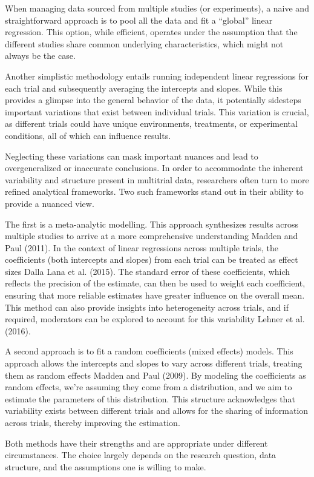 \documentclass[
  letterpaper,
]{book}
\begin{document}
When managing data sourced from multiple studies (or experiments), a
naive and straightforward approach is to pool all the data and fit a
``global'' linear regression. This option, while efficient, operates
under the assumption that the different studies share common underlying
characteristics, which might not always be the case.

Another simplistic methodology entails running independent linear
regressions for each trial and subsequently averaging the intercepts and
slopes. While this provides a glimpse into the general behavior of the
data, it potentially sidesteps important variations that exist between
individual trials. This variation is crucial, as different trials could
have unique environments, treatments, or experimental conditions, all of
which can influence results.

Neglecting these variations can mask important nuances and lead to
overgeneralized or inaccurate conclusions. In order to accommodate the
inherent variability and structure present in multitrial data,
researchers often turn to more refined analytical frameworks. Two such
frameworks stand out in their ability to provide a nuanced view.

The first is a meta-analytic modelling. This approach synthesizes
results across multiple studies to arrive at a more comprehensive
understanding Madden and Paul (2011). In the context of linear
regressions across multiple trials, the coefficients (both intercepts
and slopes) from each trial can be treated as effect sizes Dalla Lana et
al. (2015). The standard error of these coefficients, which reflects the
precision of the estimate, can then be used to weight each coefficient,
ensuring that more reliable estimates have greater influence on the
overall mean. This method can also provide insights into heterogeneity
across trials, and if required, moderators can be explored to account
for this variability Lehner et al. (2016).

A second approach is to fit a random coefficients (mixed effects)
models. This approach allows the intercepts and slopes to vary across
different trials, treating them as random effects Madden and Paul
(2009). By modeling the coefficients as random effects, we're assuming
they come from a distribution, and we aim to estimate the parameters of
this distribution. This structure acknowledges that variability exists
between different trials and allows for the sharing of information
across trials, thereby improving the estimation.

Both methods have their strengths and are appropriate under different
circumstances. The choice largely depends on the research question, data
structure, and the assumptions one is willing to make.
\end{document}
